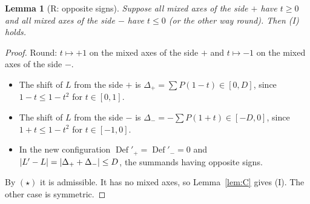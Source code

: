 \documentclass[11pt]{article}
\newtheorem{lemma}[theorem]{Lemma}
\theoremstyle{definition}
\theoremstyle{remark}
\newcommand{\Def}{\operatorname{Def}}
\DeclarePairedDelimiter{\abs}{\lvert}{\rvert}
\begin{document}
\begin{lemma}[R: opposite signs]\label{lem:R}
Suppose all mixed axes of the side $+$ have $t\ge0$ and all mixed axes of the side $-$ have $t\le0$ (or
the other way round). Then (I) holds.
\end{lemma}
\begin{proof}
Round: $t\mapsto+1$ on the mixed axes of the side $+$ and $t\mapsto-1$ on the mixed axes of the side $-$.
\begin{itemize}
\item The shift of $L$ from the side $+$ is $\Delta_+=\sum P(1-t)\in[0,D]$, since $1-t\le1-t^2$ for $t\in[0,1]$.
\item The shift of $L$ from the side $-$ is $\Delta_-=-\sum P(1+t)\in[-D,0]$, since $1+t\le1-t^2$ for $t\in[-1,0]$.
\item In the new configuration $\Def'_+=\Def'_-=0$ and $\abs{L'-L}=\abs{\Delta_++\Delta_-}\le D$, the
summands having opposite signs.
\end{itemize}
By $(\star)$ it is admissible. It has no mixed axes, so Lemma~\ref{lem:C} gives (I). The other case is symmetric.
\end{proof}
\end{document}
